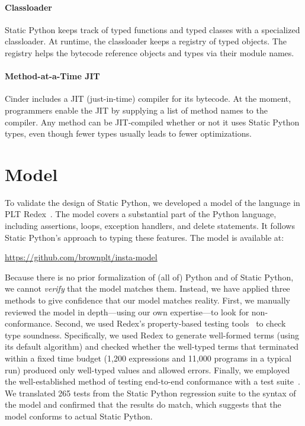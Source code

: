 \documentclass[english,cleveref,submission]{programming}
\newcommand{\SP}{Static Python}
\newcommand{\numSPtest}{265}
\begin{document}
\paragraph{Classloader}
\label{s:classloader}

\SP{} keeps track of typed functions and typed classes with a specialized classloader.
At runtime, the classloader keeps a registry of typed objects.
The registry helps the bytecode reference objects and types via their module names.


\paragraph{Method-at-a-Time JIT}
\label{s:jit}

Cinder includes a JIT (just-in-time) compiler for its bytecode.
At the moment, programmers enable the JIT by supplying a list of method names
to the compiler.
Any method can be JIT-compiled whether or not it uses \SP{} types,
even though fewer types usually leads to fewer optimizations.


\section{Model}
\label{s:model}

To validate the design of \SP{}, we developed a model of the language in PLT
Redex~\cite{kcdeffmrtf-popl-2012}.
The model covers a substantial part of the Python language, including
assertions, loops, exception handlers, and delete statements.
It follows \SP{}'s approach to typing these features.
The model is available at:
\begin{center}
  \url{https://github.com/brownplt/insta-model}
\end{center}
Because there is no prior formalization of (all of) Python and of \SP{}, we cannot
\emph{verify} that the model matches them. Instead, we have applied
three methods to give confidence that our model matches reality.
First, we manually reviewed the model in depth---using our
own expertise---to look for non-conformance.  Second, 
we used Redex's property-based testing tools~\cite{kf-sfp-2009} to check
type soundness.
Specifically, we used Redex to generate well-formed terms (using its default
algorithm) and checked whether the well-typed terms that terminated within a
fixed time budget (1,200 expressions and 11,000 programs in a typical run)
produced only well-typed values and allowed errors.
Finally, we employed the well-established method of testing end-to-end
conformance with a test suite~\cite{gsk-ecoop-2010,gclpk-dls-2012,pmmwplck-oopsla-2013,bcfgmnss-popl-2014,fgpssmds-popl-2016}.
We translated \numSPtest{} tests from the \SP{} regression suite to the
syntax of the model and confirmed that the results
do match,
which suggests that the model conforms to actual \SP{}.
\end{document}
